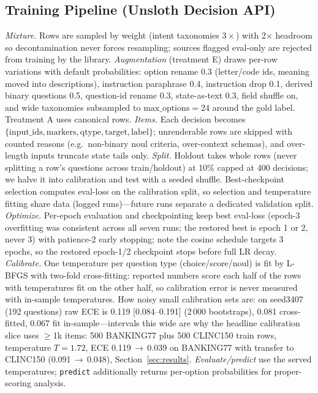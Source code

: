 \subsection{Training Pipeline (Unsloth Decision API)~\cite{unsloth-decision}}
\textit{Mixture.} Rows are sampled by weight (intent taxonomies $3\times$)
with 2$\times$ headroom so decontamination never forces resampling; sources
flagged eval-only are rejected from training by the library.
\textit{Augmentation} (treatment E) draws per-row variations with default
probabilities: option rename 0.3 (letter/code ids, meaning moved into
descriptions), instruction paraphrase 0.4, instruction drop 0.1, derived
binary questions 0.5, question-id rename 0.3, state-as-text 0.3, field shuffle
on, and wide taxonomies subsampled to $\text{max\_options}=24$ around the gold
label. Treatment A uses canonical rows.
\textit{Items.} Each decision becomes
$\{\text{input\_ids}, \text{markers}, \text{qtype}, \text{target}, \text{label}\}$;
unrenderable rows are skipped with counted reasons (e.g.\ non-binary noul
criteria, over-context schemas), and over-length inputs truncate state tails
only. \textit{Split.} Holdout takes whole rows (never splitting a row's
questions across train/holdout) at 10\% capped at 400 decisions; we halve it
into calibration and test with a seeded shuffle. Best-checkpoint selection
computes eval-loss on the calibration split, so selection and temperature
fitting share data (logged runs)---future runs separate a dedicated validation
split.
\textit{Optimize.} Per-epoch evaluation and checkpointing keep best eval-loss
(epoch-3 overfitting was consistent across all seven runs; the restored best
is epoch 1 or 2, never 3) with patience-2
early stopping; note the cosine schedule targets 3 epochs, so the restored
epoch-1/2 checkpoint stops before full LR decay. \textit{Calibrate.} One
temperature per question type (choice/score/noul) is fit by L-BFGS with
two-fold cross-fitting: reported numbers score each half of the rows with
temperatures fit on the other half, so calibration error is never measured
with in-sample temperatures. How noisy small calibration sets are: on
seed3407 (192 questions) raw ECE is 0.119 [0.084--0.191] (2\,000 bootstraps),
0.081 cross-fitted, 0.067 fit in-sample---intervals this wide are why the
headline calibration slice uses $\ge$1k items: 500 BANKING77 plus 500
CLINC150 train rows, temperature $T{=}1.72$, ECE 0.119\,$\to$\,0.039 on
BANKING77 with transfer to CLINC150 (0.091\,$\to$\,0.048),
Section~\ref{sec:results}. \textit{Evaluate/predict} use the served
temperatures; \texttt{predict} additionally returns per-option probabilities
for proper-scoring analysis.

